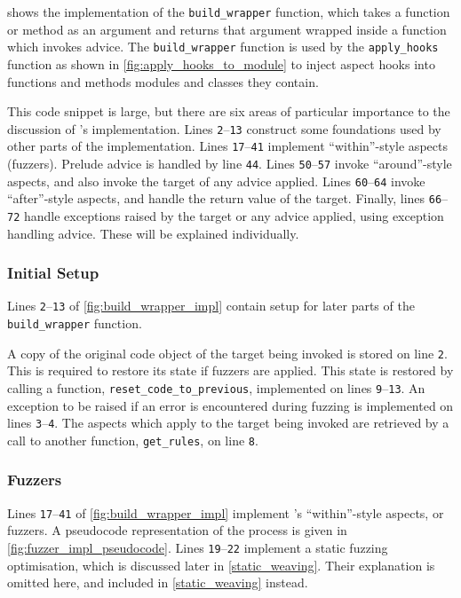  shows the implementation of the
\lstinline{build_wrapper} function, which takes a function or method as an
argument and returns that argument wrapped inside a function which invokes
advice. The \lstinline{build_wrapper} function is used by the
\lstinline{apply_hooks} function as shown in \cref{fig:apply_hooks_to_module} to
inject aspect hooks into functions and methods modules and classes they contain.

This code snippet is large, but there are six areas of particular importance to
the discussion of \pdsfthree{}'s implementation. Lines \texttt{2}--\texttt{13}
construct some foundations used by other parts of the implementation. Lines
\texttt{17}--\texttt{41} implement ``within''-style aspects (fuzzers). Prelude
advice is handled by line \texttt{44}. Lines
\texttt{50}--\texttt{57} invoke ``around''-style aspects, and also invoke the target
of any advice applied. Lines
\texttt{60}--\texttt{64} invoke ``after''-style aspects, and handle the return
value of the target. Finally, lines \texttt{66}--\texttt{72} handle exceptions
raised by the target or any advice applied, using exception handling advice.
These will be explained individually.

\subsubsection{Initial Setup}
Lines \texttt{2}--\texttt{13} of \cref{fig:build_wrapper_impl} contain setup for
later parts of the \lstinline{build_wrapper} function.

A copy of the original code object of the target being invoked is stored on line
\texttt{2}. This is required to restore its state if fuzzers are applied. This
state is restored by calling a function, \lstinline{reset_code_to_previous},
implemented on lines \texttt{9}--\texttt{13}. An exception to be raised if an
error is encountered during fuzzing is implemented on lines
\texttt{3}--\texttt{4}. The aspects which apply to the target being invoked are
retrieved by a call to another function, \lstinline{get_rules}, on line
\texttt{8}. 

\subsubsection{Fuzzers}

Lines \texttt{17}--\texttt{41} of \cref{fig:build_wrapper_impl} implement
\pdsfthree{}'s ``within''-style aspects, or fuzzers. A pseudocode representation
of the process is given in \cref{fig:fuzzer_impl_pseudocode}.
Lines \texttt{19}--\texttt{22} implement a static fuzzing optimisation, which is
discussed later in \cref{static_weaving}. Their explanation is omitted here, and
included in \cref{static_weaving} instead.

